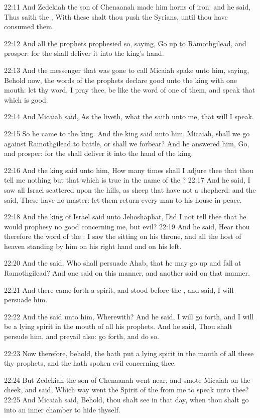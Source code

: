 22:11 And Zedekiah the son of Chenaanah made him horns of iron: and he
said, Thus saith the \LORD, With these shalt thou push the Syrians,
until thou have consumed them.

22:12 And all the prophets prophesied so, saying, Go up to
Ramothgilead, and prosper: for the \LORD shall deliver it into the
king's hand.

22:13 And the messenger that was gone to call Micaiah spake unto him,
saying, Behold now, the words of the prophets declare good unto the
king with one mouth: let thy word, I pray thee, be like the word of
one of them, and speak that which is good.

22:14 And Micaiah said, As the \LORD liveth, what the \LORD saith unto
me, that will I speak.

22:15 So he came to the king. And the king said unto him, Micaiah,
shall we go against Ramothgilead to battle, or shall we forbear? And
he answered him, Go, and prosper: for the \LORD shall deliver it into
the hand of the king.

22:16 And the king said unto him, How many times shall I adjure thee
that thou tell me nothing but that which is true in the name of the
\LORD?  22:17 And he said, I saw all Israel scattered upon the hills,
as sheep that have not a shepherd: and the \LORD said, These have no
master: let them return every man to his house in peace.

22:18 And the king of Israel said unto Jehoshaphat, Did I not tell
thee that he would prophesy no good concerning me, but evil?  22:19
And he said, Hear thou therefore the word of the \LORD: I saw the \LORD
sitting on his throne, and all the host of heaven standing by him on
his right hand and on his left.

22:20 And the \LORD said, Who shall persuade Ahab, that he may go up
and fall at Ramothgilead? And one said on this manner, and another
said on that manner.

22:21 And there came forth a spirit, and stood before the \LORD, and
said, I will persuade him.

22:22 And the \LORD said unto him, Wherewith? And he said, I will go
forth, and I will be a lying spirit in the mouth of all his prophets.
And he said, Thou shalt persude him, and prevail also: go forth, and
do so.

22:23 Now therefore, behold, the \LORD hath put a lying spirit in the
mouth of all these thy prophets, and the \LORD hath spoken evil
concerning thee.

22:24 But Zedekiah the son of Chenaanah went near, and smote Micaiah
on the cheek, and said, Which way went the Spirit of the \LORD from me
to speak unto thee?  22:25 And Micaiah said, Behold, thou shalt see in
that day, when thou shalt go into an inner chamber to hide thyself.

